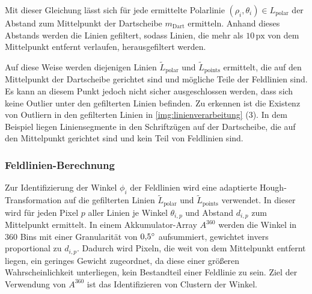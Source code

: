 Mit dieser Gleichung lässt sich für jede ermittelte Polarlinie $(\rho_i, \theta_i) \in L_\text{polar}$ der Abstand zum Mittelpunkt der Dartscheibe $m_\text{Dart}$ ermitteln. Anhand dieses Abstands werden die Linien gefiltert, sodass Linien, die mehr als $10\,\text{px}$ von dem Mittelpunkt entfernt verlaufen, herausgefiltert werden.

Auf diese Weise werden diejenigen Linien $\widetilde{L}_\text{polar}$ und $\widetilde{L}_\text{points}$ ermittelt, die auf den Mittelpunkt der Dartscheibe gerichtet sind und mögliche Teile der Feldlinien sind. Es kann an diesem Punkt jedoch nicht sicher ausgeschlossen werden, dass sich keine Outlier unter den gefilterten Linien befinden. Zu erkennen ist die Existenz von Outliern in den gefilterten Linien in \autoref{img:linienverarbeitung} (3). In dem Beispiel liegen Liniensegmente in den Schriftzügen auf der Dartscheibe, die auf den Mittelpunkt gerichtet sind und kein Teil von Feldlinien sind.

\subsubsection{Feldlinien-Berechnung}
\label{sec:feldlinien_berechnung}

Zur Identifizierung der Winkel $\phi_i$ der Feldlinien wird eine adaptierte Hough-Transformation auf die gefilterten Linien $\widetilde{L}_\text{polar}$ und $\widetilde{L}_\text{points}$ verwendet. In dieser wird für jeden Pixel $p$ aller Linien je Winkel $\theta_{i, p}$ und Abstand $d_{i, p}$ zum Mittelpunkt ermittelt. In einem Akkumulator-Array $A^{360}$ werden die Winkel in 360 Bins mit einer Granularität von $0,\!5^{\circ}$ aufsummiert, gewichtet invers proportional zu $d_{i, p}$. Dadurch wird Pixeln, die weit von dem Mittelpunkt entfernt liegen, ein geringes Gewicht zugeordnet, da diese einer größeren Wahrscheinlichkeit unterliegen, kein Bestandteil einer Feldlinie zu sein. Ziel der Verwendung von $A^{360}$ ist das Identifizieren von Clustern der Winkel.

